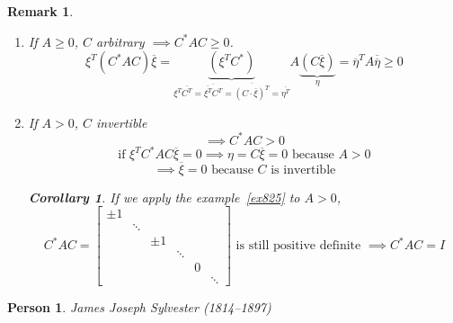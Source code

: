 \documentclass[a4paper]{article}
\newcounter{lecref}[section]
\numberwithin{lecref}{section}
\newtheorem{remark}[lecref]{Remark}
\newtheorem{corollary}[lecref]{Corollary}
\newtheorem*{Person}{Person}
\begin{document}
\begin{remark} %
  \begin{enumerate}
    \item If $A \geq 0$, $C$ arbitrary $\implies C^* AC \geq 0$.
      \[ \xi^T (C^* AC) \overline{\xi} = \underbrace{(\xi^T C^*)}_{\xi^T \overline{C^T} = \overline{\overline{\xi^T} C^T} = \overline{(C \cdot \overline{\xi})^T} = \overline{\eta^T}} A \underbrace{(C \overline{\xi})}_{\eta}
         = \overline{\eta}^T A \overline{\overline{\eta}} \geq 0
      \]
    \item If $A > 0$, $C$ invertible
      \[ \implies C^* AC > 0 \]
      \[ \text{if } \xi^T C^* AC \overline{\xi} = 0 \implies  \eta = C \overline{\xi} = 0 \text{ because } A > 0 \]
      \[ \implies \overline{\xi} = 0 \text{ because } C \text{ is invertible} \]

      \begin{corollary}
        If we apply the example~\ref{ex825} to $A>0$,
        \[
          C^* AC = \begin{bmatrix}
            \pm 1 &        &       &        &   & \\
                  & \ddots &       &        &   & \\
                  &        & \pm 1 &        &   & \\
                  &        &       & \ddots &   & \\
                  &        &       &        & 0 & \\
                  &        &       &        &   & \ddots
          \end{bmatrix}
          \text{ is still positive definite }
          \implies C^* AC = I
        \]
      \end{corollary}
  \end{enumerate}
\end{remark}

\begin{Person}
  James Joseph Sylvester (1814--1897)
\end{Person}
\end{document}
